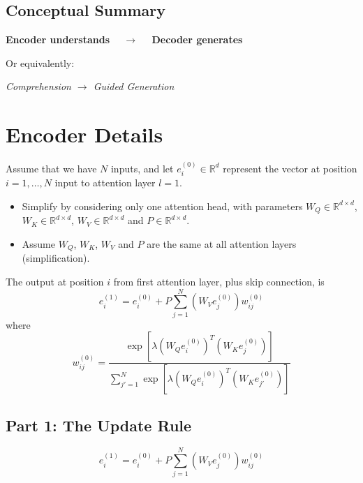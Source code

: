 \documentclass[12pt]{extarticle}
\begin{document}
\subsection*{Conceptual Summary}

\begin{center}
\textbf{Encoder understands $\quad \rightarrow \quad$ Decoder generates}
\end{center}

Or equivalently:

\begin{center}
\textit{Comprehension $\rightarrow$ Guided Generation}
\end{center}







\section{Encoder Details}
Assume that we have $N$ inputs, and let $e_i^{(0)} \in \mathbb{R}^d$ represent the vector at position $i = 1, \ldots, N$ input to attention layer $l = 1$.

\begin{itemize}
    \item Simplify by considering only one attention head, with parameters $W_Q \in \mathbb{R}^{d \times d}$, $W_K \in \mathbb{R}^{d \times d}$, $W_V \in \mathbb{R}^{d \times d}$ and $P \in \mathbb{R}^{d \times d}$.
    
    \item Assume $W_Q$, $W_K$, $W_V$ and $P$ are the same at all attention layers (simplification).
\end{itemize}

The output at position $i$ from first attention layer, plus skip connection, is
\[
e_i^{(1)} = e_i^{(0)} + P \sum_{j=1}^{N} (W_V e_j^{(0)}) w_{ij}^{(0)}
\]
where
\[
w_{ij}^{(0)} = \frac{\exp\left[\lambda (W_Q e_i^{(0)})^T (W_K e_j^{(0)})\right]}{\sum_{j'=1}^{N} \exp\left[\lambda (W_Q e_i^{(0)})^T (W_K e_{j'}^{(0)})\right]}
\]



\subsection{Part 1: The Update Rule}
\[
e_i^{(1)} = e_i^{(0)} + P \sum_{j=1}^{N} (W_V e_j^{(0)}) w_{ij}^{(0)}
\]
\end{document}
